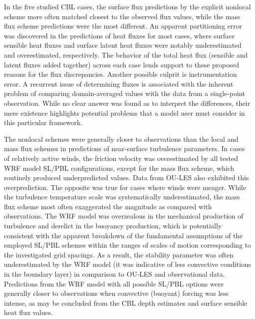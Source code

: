 In the five studied CBL cases, the surface flux predictions by the explicit nonlocal scheme more often matched closest to the observed flux values, while the mass flux scheme predictions were the most different. An apparent partitioning error was discovered in the predictions of heat fluxes for most cases, where surface sensible heat fluxes and surface latent heat fluxes were notably underestimated and overestimated, respectively. The behavior of the total heat flux (sensible and latent fluxes added together) across each case lends support to these proposed reasons for the flux discrepancies. Another possible culprit is instrumentation error. A recurrent issue of determining fluxes is associated with the inherent problem of comparing domain-averaged values with the data from a single-point observation. While no clear answer was found as to interpret the differences, their mere existence highlights potential problems that a model user must consider in this particular framework. 

The nonlocal schemes were generally closer to observations than the local and mass flux schemes in predictions of near-surface turbulence parameters. In cases of relatively active winds, the friction velocity was overestimated by all tested WRF model SL\slash PBL configurations, except for the mass flux scheme, which routinely produced underpredicted values. Data from OU-LES also exhibited this overprediction. The opposite was true for cases where winds were meager. While the turbulence temperature scale was systematically underestimated, the mass flux scheme most often exaggerated the magnitude as compared with observations. The WRF model was overzealous in the mechanical production of turbulence and derelict in the buoyancy production, which is potentially consistent with the apparent breakdown of the fundamental assumptions of the employed SL\slash PBL schemes within the ranges of scales of motion corresponding to the investigated grid spacings. As a result, the stability parameter was often underestimated by the WRF model (it was indicative of less convective conditions in the boundary layer) in comparison to OU-LES and observational data. Predictions from the WRF model with all possible SL\slash PBL options were generally closer to observations when convective (buoyant) forcing was less intense, as may be concluded from the CBL depth estimates and surface sensible heat flux values. 

